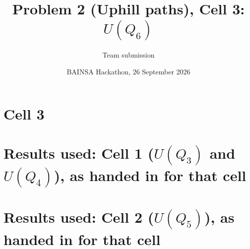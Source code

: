 
\title{Problem 2 (Uphill paths), Cell 3: $U(Q_6)$}
\author{Team submission}
\date{BAINSA Hackathon, 26 September 2026}
\maketitle
\section{Cell 3}

\appendix
\section{Results used: Cell 1 ($U(Q_3)$ and $U(Q_4)$), as handed in for that cell}

\section{Results used: Cell 2 ($U(Q_5)$), as handed in for that cell}


